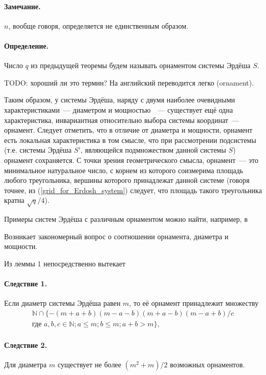 \documentclass[a4paper,14pt]{article} %
\begin{document}
\paragraph{Замечание.}
$n$, вообще говоря, определяется не единственным образом.

\paragraph{Определение.}
Число $q$ из предыдущей теоремы будем называть орнаментом системы Эрдёша $S$.

TODO: хороший ли это термин? На английский переводится легко (ornament).

Таким образом, у системы Эрдёша, наряду с двумя наиболее очевидными характеристиками~--- диаметром и мощностью~\cite{our-mz-rus}~---
существует ещё одна характеристика, инвариантная относительно выбора системы координат~--- орнамент.
Следует отметить, что в отличие от диаметра и мощности,
орнамент есть локальная характеристика в том смысле, что при рассмотрении подсистемы
(т.е. системы Эрдёша $S'$, являющейся подмножеством данной системы $S$)
орнамент сохраняется.
С точки зрения геометрического смысла, орнамент~---
это минимальное натуральное число, с корнем из которого соизмерима
площадь любого треугольника, вершины которого принадлежат данной системе
(говоря точнее, из (\ref{grid_for_Erdosh_system}) следует,
что площадь такого треугольника кратна $\sqrt{q}/4$).

Примеры систем Эрдёша с различным орнаментом можно найти, например,
в \cite{our-vvmsh-2018,our-mkmitu-2016}

Возникает закономерный вопрос о соотношении орнамента, диаметра и мощности.

Из леммы 1 непосредственно вытекает

\paragraph{Следствие 1.}
Если диаметр системы Эрдёша равен $m$,
то её орнамент принадлежит множеству
\begin{multline}
	\mathbb{N} \cap \{
		-(m+a+b)(m-a-b)(m+a-b)(m-a+b)/c
	\\
	\mbox{где }
		a,b,c\in\mathbb{N}; a \leq m; b\leq m; a+b > m
	\},
\end{multline}

\paragraph{Следствие 2.}
Для диаметра $m$ существует не более $(m^2 + m)/2$ возможных орнаментов.
\end{document}
